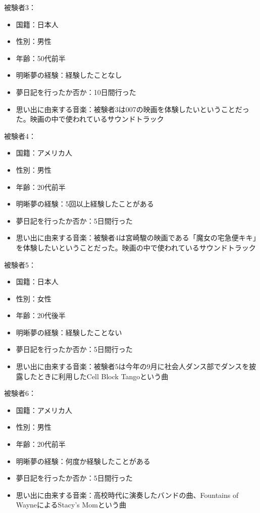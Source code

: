 被験者3：
\begin{itemize}
\item 国籍：日本人
\item 性別：男性
\item 年齢：50代前半
\item 明晰夢の経験：経験したことなし
\item 夢日記を行ったか否か：10日間行った
\item 思い出に由来する音楽：被験者3は007の映画を体験したいということだった。映画の中で使われているサウンドトラック
\end{itemize}

被験者4：
\begin{itemize}
\item 国籍：アメリカ人
\item 性別：男性
\item 年齢：20代前半
\item 明晰夢の経験：5回以上経験したことがある
\item 夢日記を行ったか否か：5日間行った
\item 思い出に由来する音楽：被験者4は宮崎駿の映画である「魔女の宅急便キキ」を体験したいということだった。映画の中で使われているサウンドトラック
\end{itemize}

被験者5：
\begin{itemize}
\item 国籍：日本人
\item 性別：女性
\item 年齢：20代後半
\item 明晰夢の経験：経験したことない
\item 夢日記を行ったか否か：5日間行った
\item 思い出に由来する音楽：被験者5は今年の9月に社会人ダンス部でダンスを披露したときに利用したCell Block Tangoという曲
\end{itemize}

被験者6：
\begin{itemize}
\item 国籍：アメリカ人
\item 性別：男性
\item 年齢：20代前半
\item 明晰夢の経験：何度か経験したことがある
\item 夢日記を行ったか否か：5日間行った
\item 思い出に由来する音楽：高校時代に演奏したバンドの曲、Fountains of WayneによるStacy's Momという曲
\end{itemize}

